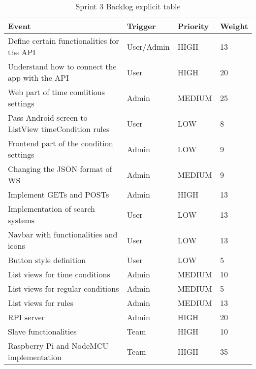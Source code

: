 \documentclass[11pt,a4paper]{article}
\begin{document}
\begin{table}[htbp]
\begin{tabular}{|l|l|l|l|} 
\hline
Event                                                   & Trigger     & Priority & Weight \\ \hline \hline
Define certain functionalities for the API              & User/Admin       & HIGH     & 13     \\ \hline
Understand how to connect the app with the API          & User      & HIGH   & 20     \\ \hline
Web part of time conditions settings                    & Admin      & MEDIUM      & 25     \\ \hline
Pass Android screen to ListView timeCondition rules     & User       & LOW   & 8     \\ \hline
Frontend part of the condition settings                 & Admin       & LOW   & 9     \\ \hline
Changing the JSON format of WS                          & Admin       & MEDIUM   & 9     \\ \hline
Implement GETs and POSTs                                & Admin       & HIGH   & 13     \\ \hline
Implementation of search systems                        & User       & LOW      & 13     \\ \hline
Navbar with functionalities and icons                   & User       & LOW   & 13     \\ \hline
Button style definition                                 & User       & LOW   & 5     \\ \hline
List views for time conditions                          & Admin       & MEDIUM   & 10      \\ \hline
List views for regular conditions                       & Admin       & MEDIUM   & 5      \\ \hline
List views for rules                                    & Admin       & MEDIUM   & 13      \\ \hline
RPI server                                              & Admin       & HIGH   & 20      \\ \hline
Slave functionalities                                   & Team       & HIGH   & 10      \\ \hline
Raspberry Pi and NodeMCU implementation                 & Team   & HIGH     & 35     \\ \hline
\end{tabular}
\caption{Sprint 3 Backlog explicit table}
\end{table}
\end{document}
